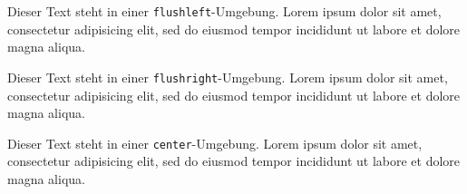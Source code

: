\begin{flushleft} Dieser Text steht in einer \texttt{flushleft}-Umgebung. Lorem ipsum dolor sit amet, consectetur adipisicing elit, sed do eiusmod tempor incididunt ut labore et dolore magna aliqua. \end{flushleft}

\begin{flushright} Dieser Text steht in einer \texttt{flushright}-Umgebung. Lorem ipsum dolor sit amet, consectetur adipisicing elit, sed do eiusmod tempor incididunt ut labore et dolore magna aliqua. \end{flushright}

\begin{center} Dieser Text steht in einer \texttt{center}-Umgebung. Lorem ipsum dolor sit amet, consectetur adipisicing elit, sed do eiusmod tempor incididunt ut labore et dolore magna aliqua. \end{center}

